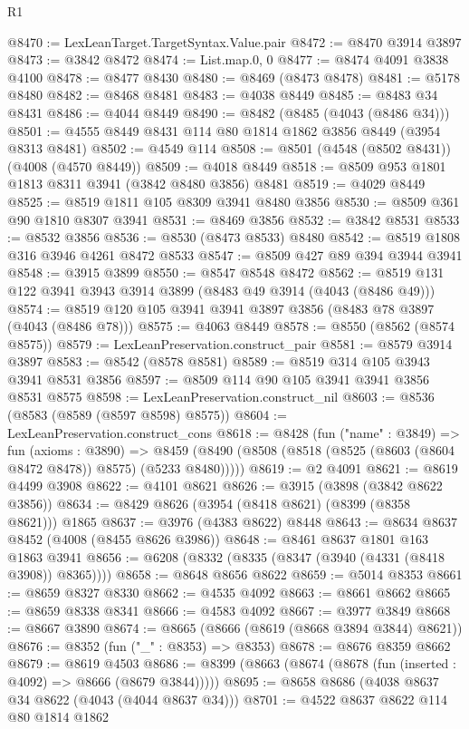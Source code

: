 \begin{lexlean}{R1}
\begin{coremodule}
@8470 := LexLeanTarget.TargetSyntax.Value.pair
@8472 := @8470 @3914 @3897
@8473 := @3842 @8472
@8474 := List.map.{0, 0}
@8477 := @8474 @4091 @3838 @4100
@8478 := @8477 @8430
@8480 := @8469 (@8473 @8478)
@8481 := @5178 @8480
@8482 := @8468 @8481
@8483 := @4038 @8449
@8485 := @8483 @34 @8431
@8486 := @4044 @8449
@8490 := @8482 (@8485 (@4043 (@8486 @34)))
@8501 := @4555 @8449 @8431 @114 @80 @1814 @1862 @3856 @8449 (@3954 @8313 @8481)
@8502 := @4549 @114
@8508 := @8501 (@4548 (@8502 @8431)) (@4008 (@4570 @8449))
@8509 := @4018 @8449
@8518 := @8509 @953 @1801 @1813 @8311 @3941 (@3842 @8480 @3856) @8481
@8519 := @4029 @8449
@8525 := @8519 @1811 @105 @8309 @3941 @8480 @3856
@8530 := @8509 @361 @90 @1810 @8307 @3941
@8531 := @8469 @3856
@8532 := @3842 @8531
@8533 := @8532 @3856
@8536 := @8530 (@8473 @8533) @8480
@8542 := @8519 @1808 @316 @3946 @4261 @8472 @8533
@8547 := @8509 @427 @89 @394 @3944 @3941
@8548 := @3915 @3899
@8550 := @8547 @8548 @8472
@8562 := @8519 @131 @122 @3941 @3943 @3914 @3899 (@8483 @49 @3914 (@4043 (@8486 @49)))
@8574 := @8519 @120 @105 @3941 @3941 @3897 @3856 (@8483 @78 @3897 (@4043 (@8486 @78)))
@8575 := @4063 @8449
@8578 := @8550 (@8562 (@8574 @8575))
@8579 := LexLeanPreservation.construct_pair
@8581 := @8579 @3914 @3897
@8583 := @8542 (@8578 @8581)
@8589 := @8519 @314 @105 @3943 @3941 @8531 @3856
@8597 := @8509 @114 @90 @105 @3941 @3941 @3856 @8531 @8575
@8598 := LexLeanPreservation.construct_nil
@8603 := @8536 (@8583 (@8589 (@8597 @8598) @8575))
@8604 := LexLeanPreservation.construct_cons
@8618 := @8428
    (fun ("name" : @3849) =>
    fun (axioms : @3890) =>
    @8459 (@8490 (@8508 (@8518 (@8525 (@8603 (@8604 @8472 @8478)) @8575) (@5233 @8480)))))
@8619 := @2 @4091
@8621 := @8619 @4499 @3908
@8622 := @4101 @8621
@8626 := @3915 (@3898 (@3842 @8622 @3856))
@8634 := @8429 @8626 (@3954 (@8418 @8621) (@8399 (@8358 @8621))) @1865
@8637 := @3976 (@4383 @8622) @8448
@8643 := @8634 @8637 @8452 (@4008 (@8455 @8626 @3986))
@8648 := @8461 @8637 @1801 @163 @1863 @3941
@8656 := @6208 (@8332 (@8335 (@8347 (@3940 (@4331 (@8418 @3908)) @8365))))
@8658 := @8648 @8656 @8622
@8659 := @5014 @8353
@8661 := @8659 @8327 @8330
@8662 := @4535 @4092
@8663 := @8661 @8662
@8665 := @8659 @8338 @8341
@8666 := @4583 @4092
@8667 := @3977 @3849
@8668 := @8667 @3890
@8674 := @8665 (@8666 (@8619 (@8668 @3894 @3844) @8621))
@8676 := @8352 (fun ("_" : @8353) => @8353)
@8678 := @8676 @8359 @8662
@8679 := @8619 @4503
@8686 := @8399 (@8663 (@8674 (@8678 (fun (inserted : @4092) => @8666 (@8679 @3844)))))
@8695 := @8658 @8686 (@4038 @8637 @34 @8622 (@4043 (@4044 @8637 @34)))
@8701 := @4522 @8637 @8622 @114 @80 @1814 @1862

\end{coremodule}
\end{lexlean}
